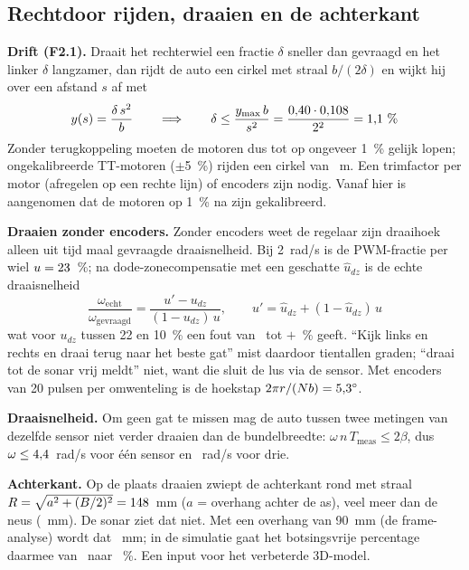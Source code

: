 \documentclass[10pt,a4paper]{article}
\begin{document}
\subsection{Rechtdoor rijden, draaien en de achterkant}
\textbf{Drift (F2.1).} Draait het rechterwiel een fractie $\delta$ sneller dan gevraagd en het linker
$\delta$ langzamer, dan rijdt de auto een cirkel met straal $b/(2\delta)$ en wijkt hij over een afstand
$s$ af met
\begin{equation}
y(s) = \frac{\delta\, s^2}{b}
\qquad\Longrightarrow\qquad
\delta \le \frac{y_{\max}\, b}{s^2} = \frac{0{,}40 \cdot 0{,}108}{2^2} = 1{,}1~\%
\label{eq:drift}
\end{equation}
Zonder terugkoppeling moeten de motoren dus tot op ongeveer 1~\% gelijk lopen; ongekalibreerde
TT-motoren ($\pm$5~\%) rijden een cirkel van \ObstRcirkel~m. Een trimfactor per motor (afregelen op een
rechte lijn) of encoders zijn nodig. Vanaf hier is aangenomen dat de motoren op 1~\% na zijn
gekalibreerd.

\textbf{Draaien zonder encoders.} Zonder encoders weet de regelaar zijn draaihoek alleen uit tijd maal
gevraagde draaisnelheid. Bij 2~rad/s is de PWM-fractie per wiel $u = 23$~\%; na
dode-zonecompensatie met een geschatte $\hat u_{dz}$ is de echte draaisnelheid
\begin{equation}
\frac{\omega_{\text{echt}}}{\omega_{\text{gevraagd}}} = \frac{u' - u_{dz}}{(1 - u_{dz})\,u},\qquad
u' = \hat u_{dz} + (1 - \hat u_{dz})\,u
\label{eq:draaifout}
\end{equation}
wat voor $u_{dz}$ tussen 22 en 10~\% een fout van \ObstDraaiMin\ tot $+$\ObstDraaiMax~\% geeft.
``Kijk links en rechts en draai terug naar het beste gat'' mist daardoor tientallen graden; ``draai tot
de sonar vrij meldt'' niet, want die sluit de lus via de sensor. Met encoders van 20 pulsen per
omwenteling is de hoekstap $2\pi r/(N b) = 5{,}3^\circ$.

\textbf{Draaisnelheid.} Om geen gat te missen mag de auto tussen twee metingen van dezelfde sensor niet
verder draaien dan de bundelbreedte: $\omega\, n\, T_{\text{meas}} \le 2\beta$, dus
$\omega \le 4{,}4$~rad/s voor één sensor en \ObstWmaxDrie~rad/s voor drie.

\textbf{Achterkant.} Op de plaats draaien zwiept de achterkant rond met straal
$R = \sqrt{a^2 + (B/2)^2} = 148$~mm ($a$ = overhang achter de as), veel meer dan de neus
(\ObstRvoor~mm). De sonar ziet dat niet. Met een overhang van 90~mm (de frame-analyse) wordt dat
\ObstRzwaaiKort~mm; in de simulatie gaat het botsingsvrije percentage daarmee van \ObstBestPv\ naar
\ObstKortPv~\%. Een input voor het verbeterde 3D-model.
\end{document}
